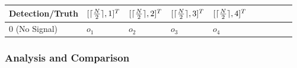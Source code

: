 \documentclass[11pt]{article}
\DeclarePairedDelimiter{\ceil}{\lceil}{\rceil}
\begin{document}
\begin{enumerate}
\begin{enumerate}
                \begin{tabular}{l|l|l|l|l|l|l|l|l|l}
                    Detection/Truth&$[\ceil{\frac{N}{2}}, 1]^T$&$[\ceil{\frac{N}{2}}, 2]^T$&$[\ceil{\frac{N}{2}}, 3]^T$&$[\ceil{\frac{N}{2}}, 4]^T$\\\hline
                    $0$ (No Signal)&$o_1$&$o_2$&$o_3$&$o_4$\\\hline
                \end{tabular}
                
            \end{enumerate}
            
        \end{enumerate}
    
    
    \subsubsection{Analysis and Comparison}
    
\end{document}
